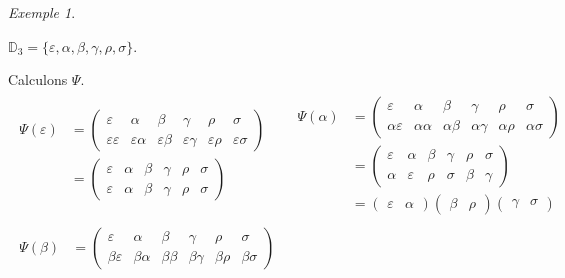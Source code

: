 \documentclass{report}
\theoremstyle{definition}
\theoremstyle{remark}
\newtheorem*{exem}{Exemple}
\begin{document}
	\begin{exem}~

		$\mathbb{D}_3 = \{\varepsilon, \alpha, \beta, \gamma, \rho, \sigma\}$.

		Calculons $\Psi$.
		\begin{align*}
			\begin{split}
				\Psi(\varepsilon)&= \begin{pmatrix}
					\varepsilon&\alpha&\beta&\gamma&\rho&\sigma\\
					\varepsilon\varepsilon&\varepsilon\alpha&\varepsilon\beta&\varepsilon\gamma&\varepsilon\rho&\varepsilon\sigma
				\end{pmatrix}\\
				&= \begin{pmatrix}
					\varepsilon&\alpha&\beta&\gamma&\rho&\sigma\\
					\varepsilon&\alpha&\beta&\gamma&\rho&\sigma
				\end{pmatrix}
			\end{split}
			&
			\begin{split}
				\Psi(\alpha)&= \begin{pmatrix}
					\varepsilon&\alpha&\beta&\gamma&\rho&\sigma\\
					\alpha\varepsilon&\alpha\alpha&\alpha\beta&\alpha\gamma&\alpha\rho&\alpha\sigma
				\end{pmatrix}\\
				&= \begin{pmatrix}
					\varepsilon&\alpha&\beta&\gamma&\rho&\sigma\\
					\alpha&\varepsilon&\rho&\sigma&\beta&\gamma
				\end{pmatrix}\\
				&= \begin{pmatrix}
					\varepsilon&\alpha
				\end{pmatrix} \begin{pmatrix}
					\beta&\rho
				\end{pmatrix} \begin{pmatrix}
					\gamma&\sigma
				\end{pmatrix}
			\end{split}
			\\[1em]
			\begin{split}
				\Psi(\beta)&= \begin{pmatrix}
					\varepsilon&\alpha&\beta&\gamma&\rho&\sigma\\
					\beta\varepsilon&\beta\alpha&\beta\beta&\beta\gamma&\beta\rho&\beta\sigma
				\end{pmatrix}\\

\end{split}
\end{align*}
\end{exem}
\end{document}
